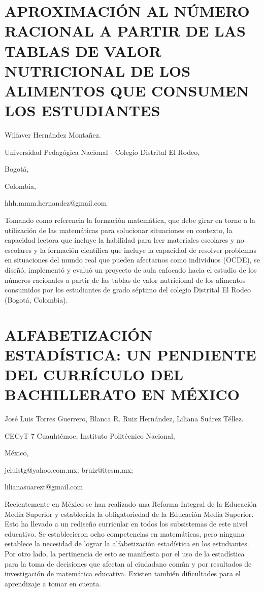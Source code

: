 \section{APROXIMACIÓN AL NÚMERO RACIONAL A PARTIR DE LAS TABLAS DE VALOR NUTRICIONAL
DE LOS ALIMENTOS QUE CONSUMEN LOS ESTUDIANTES }

\begin{datos}

Wilfaver Hernández Montañez.

Universidad Pedagógica Nacional - Colegio Distrital El Rodeo,

Bogotá,

Colombia,

hhh.mmm.hernandez@gmail.com 

\end{datos}

Tomando como referencia la formación matemática, que debe girar en
torno a la utilización de las matemáticas para solucionar situaciones
en contexto, la capacidad lectora que incluye la habilidad para leer
materiales escolares y no escolares y la formación científica que
incluye la capacidad de resolver problemas en situaciones del mundo
real que pueden afectarnos como individuos (OCDE), se diseñó, implementó
y evaluó un proyecto de aula enfocado hacia el estudio de los números
racionales a partir de las tablas de valor nutricional de los alimentos
consumidos por los estudiantes de grado séptimo del colegio Distrital
El Rodeo (Bogotá, Colombia). 


\section{ALFABETIZACIÓN ESTADÍSTICA: UN PENDIENTE DEL CURRÍCULO DEL BACHILLERATO
EN MÉXICO}

\begin{datos}

José Luis Torres Guerrero, Blanca R. Ruiz Hernández, Liliana Suárez
Téllez.

CECyT 7 Cuauhtémoc, Instituto Politécnico Nacional,

México,

jeluistg@yahoo.com.mx; bruiz@itesm.mx;

lilianasuarezt@gmail.com

\end{datos}

Recientemente en México se han realizado una Reforma Integral de la
Educación Media Superior y establecida la obligatoriedad de la Educación
Media Superior. Esto ha llevado a un rediseño curricular en todos
los subsistemas de este nivel educativo. Se establecieron ocho competencias
en matemáticas, pero ninguna establece la necesidad de lograr la alfabetización
estadística en los estudiantes. Por otro lado, la pertinencia de esto
se manifiesta por el uso de la estadística para la toma de decisiones
que afectan al ciudadano común y por resultados de investigación de
matemática educativa. Existen también dificultades para el aprendizaje
a tomar en cuenta. 


